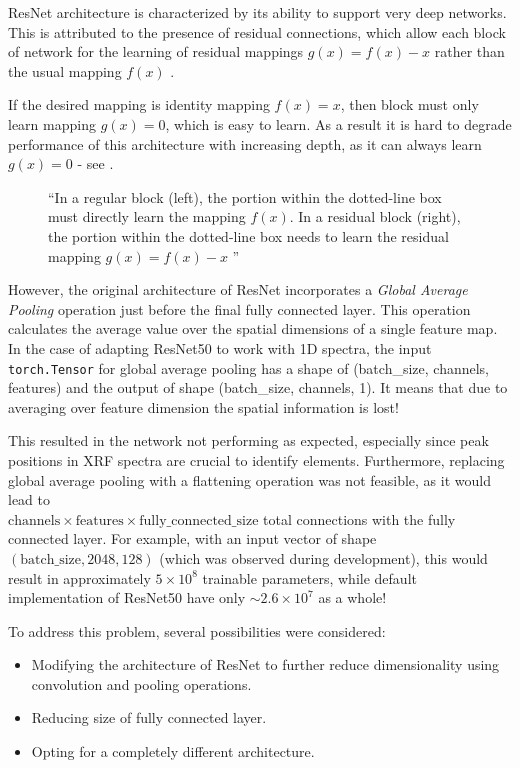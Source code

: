 ResNet architecture is characterized by its ability to support very deep networks. This is attributed to the presence of residual connections, which allow each block of network for the learning of residual mappings $g(x) = f(x) - x$ rather than the usual mapping $f(x)$ \cite{d2lResnet}. 

If the desired mapping is identity mapping $f(x) = x$, then block must only learn mapping $g(x) = 0$, which is easy to learn. 
As a result it is hard to degrade performance of this architecture with increasing depth, as it can always learn $g(x) = 0$ - see .

\begin{figure}[h] 
  \centering     
   
  \caption{``In a regular block (left), the portion within the dotted-line box must directly learn the mapping $f(x)$. 
  In a residual block (right), the portion within the dotted-line box needs to learn the residual mapping $g(x) = f(x) - x$ \cite{d2lResnet}''}
  \label{fig:residual-block}
\end{figure}

However, the original architecture of ResNet incorporates a \emph{Global Average Pooling} operation just before the final fully connected layer. 
This operation calculates the average value over the spatial dimensions of a single feature map. 
In the case of adapting ResNet50 to work with 1D spectra, the input \texttt{torch.Tensor} for global average pooling has a shape of (batch\_size, channels, features) and the output of shape (batch\_size, channels, 1). 
It means that due to averaging over feature dimension the spatial information is lost!

This resulted in the network not performing as expected, especially since peak positions in XRF spectra are crucial to identify elements. 
Furthermore, replacing global average pooling with a flattening operation was not feasible, as it would lead to \\ $\text{{channels}} \times \text{{features}} \times \text{{fully\_connected\_size}}$ total connections with the fully connected layer. 
For example, with an input vector of shape $(\text{{batch\_size}}, 2048, 128)$ (which was observed during development), this would result in approximately $5 \times 10^{8}$ trainable parameters, while default implementation of ResNet50 have only $\sim2.6 \times 10^7$ as a whole!

To address this problem, several possibilities were considered:
\begin{itemize}
    \item Modifying the architecture of ResNet to further reduce dimensionality using convolution and pooling operations.
    \item Reducing size of fully connected layer.
    \item Opting for a completely different architecture.
\end{itemize}

